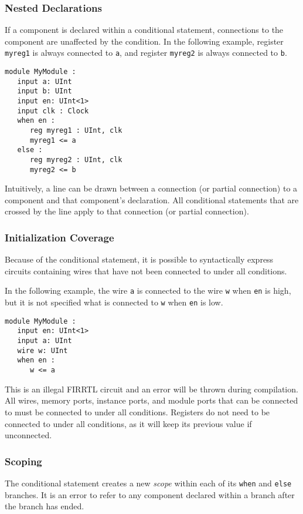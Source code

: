 \documentclass[12pt]{article}
\begin{document}
\subsubsection{Nested Declarations}
If a component is declared within a conditional statement, connections to the component are unaffected by the condition. In the following example, register \verb|myreg1| is always connected to \verb|a|, and register \verb|myreg2| is always connected to \verb|b|.

\begin{lstlisting}
module MyModule :
   input a: UInt
   input b: UInt
   input en: UInt<1>
   input clk : Clock
   when en :
      reg myreg1 : UInt, clk
      myreg1 <= a
   else :
      reg myreg2 : UInt, clk
      myreg2 <= b
\end{lstlisting}

Intuitively, a line can be drawn between a connection (or partial connection) to a component and that component's declaration. All conditional statements that are crossed by the line apply to that connection (or partial connection).

\subsubsection{Initialization Coverage}
Because of the conditional statement, it is possible to syntactically express circuits containing wires that have not been connected to under all conditions.

In the following example, the wire \verb|a| is connected to the wire \verb|w| when \verb|en| is high, but it is not specified what is connected to \verb|w| when \verb|en| is low.

\begin{lstlisting}
module MyModule :
   input en: UInt<1>
   input a: UInt
   wire w: UInt
   when en :
      w <= a
\end{lstlisting}

This is an illegal FIRRTL circuit and an error will be thrown during compilation. All wires, memory ports, instance ports, and module ports that can be connected to must be connected to under all conditions. Registers do not need to be connected to under all conditions, as it will keep its previous value if unconnected.

\subsubsection{Scoping}
The conditional statement creates a new {\em scope} within each of its \verb|when| and \verb|else| branches. It is an error to refer to any component declared within a branch after the branch has ended.
\end{document}
